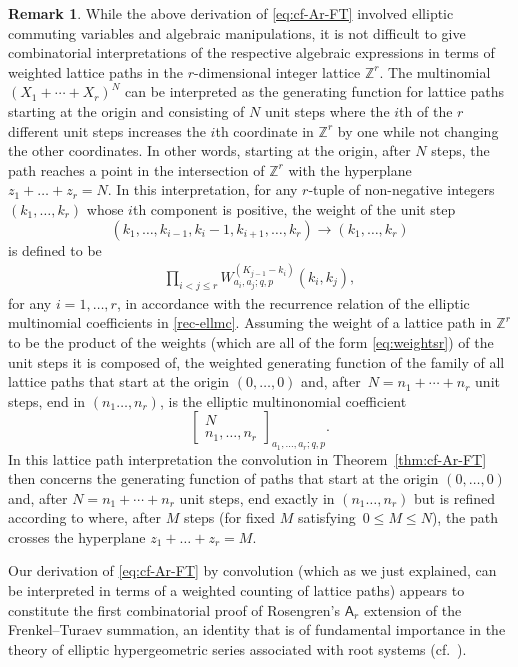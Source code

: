 \documentclass[10pt,a4paper]{amsart}
\numberwithin{equation}{section}
\theoremstyle{definition}
\newtheorem{Remark}[Theorem]{Remark}
\begin{document}
\begin{Remark}
While the above derivation of \eqref{eq:cf-Ar-FT}
involved elliptic commuting variables and algebraic manipulations,
it is not difficult to give combinatorial interpretations of the
respective algebraic expressions
in terms of weighted lattice paths in the $r$-dimensional integer lattice
$\mathbb Z^r$. The multinomial $(X_1+\cdots+X_r)^N$
can be interpreted as the generating function for lattice paths
starting at the origin and consisting of $N$ unit steps
where the $i$th of the $r$ different unit steps increases
the $i$th coordinate in $\mathbb Z^r$ by one
while not changing the other coordinates.
In other words, starting at the origin,
after $N$ steps, the path reaches a point in the intersection of
$\mathbb Z^r$ with the hyperplane $z_1+\dots+z_r=N$.
In this interpretation, for any $r$-tuple of non-negative integers
$(k_1,\dots,k_r)$ whose $i$th component is positive,
the weight of the unit step
\[
(k_1,\dots,k_{i-1},k_i-1,k_{i+1},\dots,k_r)\to
(k_1,\dots,k_r)
\]
is defined to be
\begin{gather}\label{eq:weightsr}
 \prod_{i<j\le r}W_{a_i,a_j;q,p}^{(K_{j-1}-k_i)}(k_i,k_j),
\end{gather}
for any $i=1,\dots,r$, in accordance with the recurrence relation of the
elliptic multinomial coefficients in \eqref{rec-ellmc}.
Assuming the weight of a lattice path in $\mathbb Z^r$
to be the product of the weights (which are all of the form
\eqref{eq:weightsr}) of the unit steps it is composed of,
the weighted generating function of the family of all lattice paths
that start at the origin $(0,\dots,0)$ and, after~${N=n_1+\cdots+n_r}$ unit steps, end in $(n_1\dots,n_r)$,
is the elliptic multinonomial coefficient
\[
\begin{bmatrix}N\\n_1,\dots,n_r\end{bmatrix}_{a_1,\dots,a_r;q,p}.
\]
In this lattice path interpretation the convolution in
Theorem~\ref{thm:cf-Ar-FT} then concerns the generating function
of paths that start at the origin $(0,\dots,0)$ and, after
$N=n_1+\cdots+n_r$ unit steps, end exactly in $(n_1\dots,n_r)$
but is refined according to where, after $M$ steps (for fixed $M$
satisfying~${0\le M\le N}$), the path crosses the hyperplane
$z_1+\dots+z_r=M$.

Our derivation of \eqref{eq:cf-Ar-FT}
by convolution (which as we just explained, can be interpreted
in terms of a weighted counting of lattice paths) appears to
constitute the first combinatorial proof of Rosengren's
$\mathsf A_r$ extension of the Frenkel--Turaev summation,
an identity that is of fundamental importance in the theory of
elliptic hypergeometric series associated with root
systems (cf.\ \cite{RW}).
\end{Remark}
\end{document}
